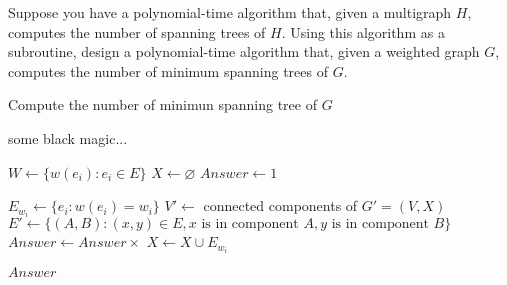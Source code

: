



\begin{thm}{}{}
    Suppose you have a polynomial-time algorithm that, given a multigraph $H$, computes the number of spanning trees of $H$. Using this algorithm as a subroutine, design a polynomial-time algorithm that, given a weighted graph $G$, computes the number of minimum spanning trees of $G$.
\end{thm}

\begin{algorithm}
    \caption{Compute the number of minimun spanning tree of $G$}
    \begin{algorithmic}

            some black magic...

        \EndFunction


            \State $W \gets \{w(e_i): e_i \in E\}$
            \State $X \gets \varnothing$
            \State $Answer \gets 1$


                \State $E_{w_i} \gets \{e_i: w(e_i) = w_i\} $
                \State $V' \gets$ connected components of $G' = (V, X)$
                \State $E' \gets \{(A, B): (x, y) \in E, x \text{ is in component } A, y \text{ is in component } B\}$
                \State $Answer \gets Answer \times$ 
                \State $X \gets X \cup E_{w_i}$

            \EndFor

            \Return $Answer$

        \EndFunction
    \end{algorithmic}

\end{algorithm}

